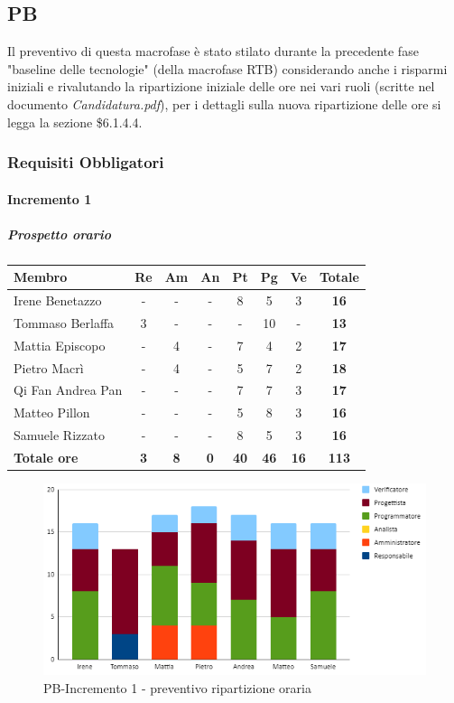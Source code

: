 \subsection{PB}
Il preventivo di questa macrofase è stato stilato durante la precedente fase "baseline delle tecnologie" (della macrofase RTB) considerando anche i risparmi iniziali e rivalutando la ripartizione iniziale delle ore nei vari ruoli (scritte nel documento \emph{Candidatura.pdf}), per i dettagli sulla nuova ripartizione delle ore si legga la sezione \$6.1.4.4.
\subsubsection{Requisiti Obbligatori}
\paragraph{Incremento 1}
\subparagraph{Prospetto orario}
\begin{center}
	\renewcommand{\arraystretch}{1.8} %
	\begin{tabular}{ |m{10em}|c|c|c|c|c|c|c| }
	\hline
	\textbf{Membro} & \textbf{Re} & \textbf{Am} &  \textbf{An} &  \textbf{Pt} &  \textbf{Pg} &  \textbf{Ve} &  \textbf{Totale}\\
    \hline
    Irene Benetazzo   & - & - & - & 8 & 5 & 3 & \textbf{16} \\
    \hline
    Tommaso Berlaffa  & 3 & - & - & - & 10 & - & \textbf{13} \\
    \hline
    Mattia Episcopo   & - & 4 & - & 7 & 4 & 2 & \textbf{17} \\
    \hline
    Pietro Macrì      & - & 4 & - & 5 & 7 & 2 & \textbf{18} \\
    \hline
    Qi Fan Andrea Pan & - & - & - & 7 & 7 & 3 & \textbf{17} \\
    \hline
    Matteo Pillon     & - & - & - & 5 & 8 & 3 & \textbf{16} \\
    \hline
    Samuele Rizzato   & - & - & - & 8 & 5 & 3 & \textbf{16} \\
    \hline
    \textbf{Totale ore} & \textbf{3} & \textbf{8} &  \textbf{0} &  \textbf{40} &  \textbf{46} &  \textbf{16} &  \textbf{113}\\
    \hline
	\end{tabular}
\end{center}
\begin{figure}[H]
   \centering\includegraphics{images/preventivo/PB-incremento1-ore.png}
   \caption{PB-Incremento 1 - preventivo ripartizione oraria}
\end{figure}


